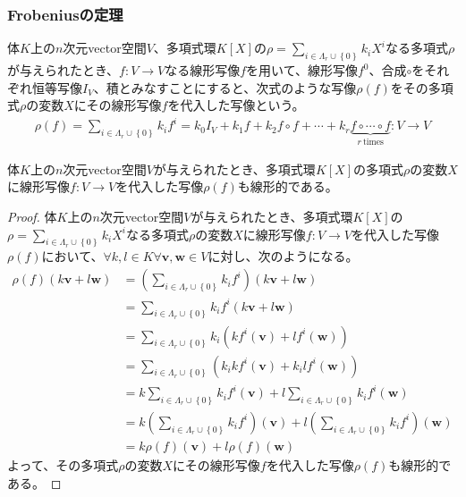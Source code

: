 \documentclass[dvipdfmx]{jsarticle}
\begin{document}
\subsubsection{Frobeniusの定理}%
\begin{dfn}
体$K$上の$n$次元vector空間$V$、多項式環$K[ X]$の$\rho = \sum_{i \in \varLambda_{r} \cup \left\{ 0 \right\}} {k_{i}X^{i}}$なる多項式$\rho$が与えられたとき、$f:V \rightarrow V$なる線形写像$f$を用いて、線形写像$f^{0}$、合成$\circ$をそれぞれ恒等写像$I_{V}$、積とみなすことにすると、次式のような写像$\rho(f)$をその多項式$\rho$の変数$X$にその線形写像$f$を代入した写像という。
\begin{align*}
\rho(f) = \sum_{i \in \varLambda_{r} \cup \left\{ 0 \right\}} {k_{i}f^{i}} = k_{0}I_{V} + k_{1}f + k_{2}f \circ f + \cdots + k_{r}{\underbrace{f \circ \cdots \circ f}_{r\ \mathrm{times}}}:V \rightarrow V
\end{align*}
\end{dfn}
\begin{thm}\label{2.2.3.4}
体$K$上の$n$次元vector空間$V$が与えられたとき、多項式環$K[ X]$の多項式$\rho$の変数$X$に線形写像$f:V \rightarrow V$を代入した写像$\rho(f)$も線形的である。
\end{thm}
\begin{proof}
体$K$上の$n$次元vector空間$V$が与えられたとき、多項式環$K[ X]$の$\rho = \sum_{i \in \varLambda_{r} \cup \left\{ 0 \right\}} {k_{i}X^{i}}$なる多項式$\rho$の変数$X$に線形写像$f:V \rightarrow V$を代入した写像$\rho(f)$において、$\forall k,l \in K\forall\mathbf{v},\mathbf{w} \in V$に対し、次のようになる。
\begin{align*}
\rho(f)\left( k\mathbf{v} + l\mathbf{w} \right) &= \left( \sum_{i \in \varLambda_{r} \cup \left\{ 0 \right\}} {k_{i}f^{i}} \right)\left( k\mathbf{v} + l\mathbf{w} \right)\\
&= \sum_{i \in \varLambda_{r} \cup \left\{ 0 \right\}} {k_{i}f^{i}\left( k\mathbf{v} + l\mathbf{w} \right)}\\
&= \sum_{i \in \varLambda_{r} \cup \left\{ 0 \right\}} {k_{i}\left( kf^{i}\left( \mathbf{v} \right) + lf^{i}\left( \mathbf{w} \right) \right)}\\
&= \sum_{i \in \varLambda_{r} \cup \left\{ 0 \right\}} \left( k_{i}kf^{i}\left( \mathbf{v} \right) + k_{i}lf^{i}\left( \mathbf{w} \right) \right)\\
&= k\sum_{i \in \varLambda_{r} \cup \left\{ 0 \right\}} {k_{i}f^{i}\left( \mathbf{v} \right)} + l\sum_{i \in \varLambda_{r} \cup \left\{ 0 \right\}} {k_{i}f^{i}\left( \mathbf{w} \right)}\\
&= k\left( \sum_{i \in \varLambda_{r} \cup \left\{ 0 \right\}} {k_{i}f^{i}} \right)\left( \mathbf{v} \right) + l\left( \sum_{i \in \varLambda_{r} \cup \left\{ 0 \right\}} {k_{i}f^{i}} \right)\left( \mathbf{w} \right)\\
&= k\rho(f)\left( \mathbf{v} \right) + l\rho(f)\left( \mathbf{w} \right)
\end{align*}
よって、その多項式$\rho$の変数$X$にその線形写像$f$を代入した写像$\rho(f)$も線形的である。
\end{proof}
\end{document}
